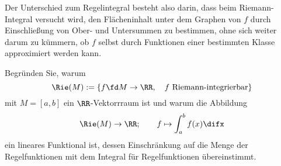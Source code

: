 \begin{antwort}

\medskip\noindent
Der Unterschied zum Regelintegral besteht also darin, dass beim 
Riemann-Integral  versucht wird, den Flächeninhalt unter 
dem Graphen von $f$ durch Einschließung von Ober- und Untersummen zu 
bestimmen, ohne sich weiter darum zu kümmern, ob $f$ selbst durch Funktionen 
einer bestimmten Klasse approximiert werden kann. 
\AntEnd
\end{antwort}

\begin{frage}\label{06_riem}
Begründen Sie, warum 
\[
\Rie(M) := \{ f \fd M\to\RR, \quad\text{$f$ Riemann-integrierbar} \} 
\]
mit $M=[a,b]$ ein $\RR$-Vektorrraum ist und warum die Abbildung 
\[
\Rie(M) \to \RR; \qquad f \mapsto \int_a^b f(x) \difx 
\]
ein lineares Funktional ist, dessen Einschränkung auf die Menge der 
Regelfunktionen mit dem Integral für Regelfunktionen übereinstimmt.
\end{frage}

